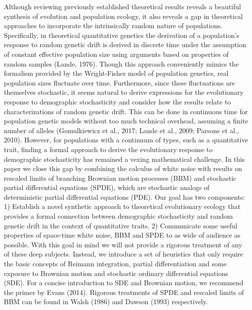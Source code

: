 \documentclass[]{elsarticle} %
\begin{document}
Although reviewing previously established theoretical results reveals a
beautiful synthesis of evolution and population ecology, it also reveals
a gap in theoretical approaches to incorporate the intrinsically random
nature of populations. Specifically, in theoretical quantitative
genetics the derivation of a population's response to random genetic
drift is derived in discrete time under the assumption of constant
effective population size using arguments based on properties of random
samples (Lande, 1976). Though this approach conveniently mimics the
formalism provided by the Wright-Fisher model of population genetics,
real population sizes fluctuate over time. Furthermore, since these
fluctuations are themselves stochastic, it seems natural to derive
expressions for the evolutionary response to demographic stochasticity
and consider how the results relate to characterizations of random
genetic drift. This can be done in continuous time for population
genetic models without too much technical overhead, assuming a finite
number of alleles (Gomulkiewicz et al., 2017; Lande et al., 2009;
Parsons et al., 2010). However, for populations with a continuum of
types, such as a quantitative trait, finding a formal approach to derive
the evolutionary response to demographic stochasticity has remained a
vexing mathematical challenge. In this paper we close this gap by
combining the calculus of white noise with results on rescaled limits of
branching Brownian motion processes (BBM) and stochastic partial
differential equations (SPDE), which are stochastic analogs of
deterministic partial differential equations (PDE). Our goal has two
components: 1) Establish a novel synthetic approach to theoretical
evolutionary ecology that provides a formal connection between
demographic stochasticity and random genetic drift in the context of
quantitative traits. 2) Communicate some useful properties of space-time
white noise, BBM and SPDE to as wide of audience as possible. With this
goal in mind we will not provide a rigorous treatment of any of these
deep subjects. Instead, we introduce a set of heuristics that only
require the basic concepts of Reimann integration, partial
differentiation and some exposure to Brownian motion and stochastic
ordinary differential equations (SDE). For a concise introduction to SDE
and Brownian motion, we recommend the primer by Evans (2014). Rigorous
treatments of SPDE and rescaled limits of BBM can be found in Walsh
(1986) and Dawson (1993) respectively.
\end{document}
